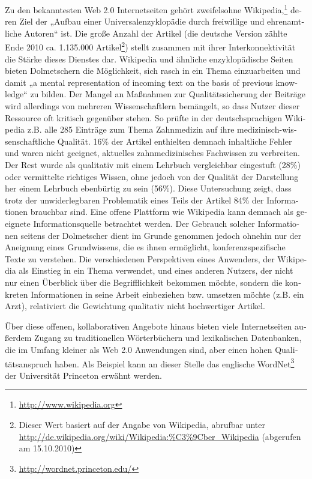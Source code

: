 \documentclass[output=paper]{LSP/langsci}
\begin{document}
\begin{otherlanguage}{ngerman}
Zu den bekanntesten Web 2.0 Internetseiten gehört zweifelsohne Wikipedia,\footnote{\url{http://www.wikipedia.org}} deren Ziel der „Aufbau einer Universalenzyklopädie durch freiwillige und ehrenamtliche Autoren“ ist. Die große Anzahl der Artikel (die deutsche Version zählte Ende 2010 ca. 1.135.000 Artikel\footnote{Dieser Wert basiert auf der Angabe von Wikipedia, abrufbar unter \url{http://de.wikipedia.org/wiki/Wikipedia:\%C3\%9Cber\_Wikipedia} (abgerufen am 15.10.2010)}) stellt zusammen mit ihrer Interkonnektivität die Stärke dieses Dienstes dar. Wikipedia und ähnliche enzyklopädische Seiten bieten Dolmetschern die Möglichkeit, sich rasch in ein Thema einzuarbeiten und damit „a mental representation of incoming text on the basis of previous knowledge“ \citep[777]{Kalina2005} zu bilden. Der Mangel an Maßnahmen zur Qualitätssicherung der Beiträge wird allerdings von mehreren Wissenschaftlern bemängelt, so dass Nutzer dieser Ressource oft kritisch gegenüber stehen. So prüfte \citet{Lorenz2009} in der deutschsprachigen Wikipedia z.B. alle 285 Einträge zum Thema Zahnmedizin auf ihre medizinisch-wissenschaftliche Qualität. 16\% der Artikel enthielten demnach inhaltliche Fehler und waren nicht geeignet, aktuelles zahnmedizinisches Fachwissen zu verbreiten. Der Rest wurde als qualitativ mit einem Lehrbuch vergleichbar eingestuft (28\%) oder vermittelte richtiges Wissen, ohne jedoch von der Qualität der Darstellung her einem Lehrbuch ebenbürtig zu sein (56\%). Diese Untersuchung zeigt, dass trotz der unwiderlegbaren Problematik eines Teils der Artikel 84\% der Informationen brauchbar sind. Eine offene Plattform wie Wikipedia kann demnach als geeignete Informationsquelle betrachtet werden. Der Gebrauch solcher Informationen seitens der Dolmetscher dient im Grunde genommen jedoch ohnehin nur der Aneignung eines Grundwissens, die es ihnen ermöglicht, konferenzspezifische Texte zu verstehen. Die verschiedenen Perspektiven eines Anwenders, der Wikipedia als Einstieg in ein Thema verwendet, und eines anderen Nutzers, der nicht nur einen Überblick über die Begrifflichkeit bekommen möchte, sondern die konkreten Informationen in seine Arbeit einbeziehen bzw. umsetzen möchte (z.B. ein Arzt), relativiert die Gewichtung qualitativ nicht hochwertiger Artikel.

Über diese offenen, kollaborativen Angebote hinaus bieten viele Internetseiten außerdem Zugang zu traditionellen Wörterbüchern und lexikalischen Datenbanken, die im Umfang kleiner als Web 2.0 Anwendungen sind, aber einen hohen Qualitätsanspruch haben. Als Beispiel kann an dieser Stelle das englische WordNet\footnote{\url{http://wordnet.princeton.edu/}} der Universität Princeton erwähnt werden.


\end{otherlanguage}
\end{document}
